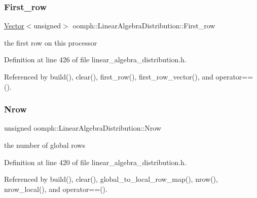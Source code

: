 \subsubsection{\texorpdfstring{First\+\_\+row}{First\_row}}
{\footnotesize\ttfamily \hyperlink{classoomph_1_1Vector}{Vector}$<$unsigned$>$ oomph\+::\+Linear\+Algebra\+Distribution\+::\+First\+\_\+row\hspace{0.3cm}{\ttfamily [private]}}



the first row on this processor 



Definition at line 426 of file linear\+\_\+algebra\+\_\+distribution.\+h.



Referenced by build(), clear(), first\+\_\+row(), first\+\_\+row\+\_\+vector(), and operator==().

\mbox{\label{classoomph_1_1LinearAlgebraDistribution_a59d82db90a05edbf0444a31cc6b8f0b2}} 
\subsubsection{\texorpdfstring{Nrow}{Nrow}}
{\footnotesize\ttfamily unsigned oomph\+::\+Linear\+Algebra\+Distribution\+::\+Nrow\hspace{0.3cm}{\ttfamily [private]}}



the number of global rows 



Definition at line 420 of file linear\+\_\+algebra\+\_\+distribution.\+h.



Referenced by build(), clear(), global\+\_\+to\+\_\+local\+\_\+row\+\_\+map(), nrow(), nrow\+\_\+local(), and operator==().

\mbox{\label{classoomph_1_1LinearAlgebraDistribution_a3b9b16db35836dc06b160c0ddaa8e3fc}} 
